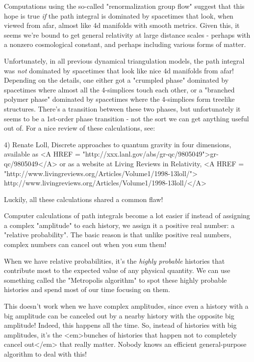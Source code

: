 Computations using the so-called "renormalization group flow" suggest 
that this hope is true \emph{if} the path integral is dominated by spacetimes 
that look, when viewed from afar, almost like 4d manifolds with smooth 
metrics.  Given this, it seems we're bound to get general relativity at
large distance scales - perhaps with a nonzero cosmological constant, and
perhaps including various forms of matter.  

Unfortunately, in all previous dynamical triangulation models, the path
integral was \emph{not} 
dominated by spacetimes that look like nice 4d manifolds
from afar!  Depending on the details, one either got a "crumpled 
phase"
dominated by spacetimes where almost all the 4-simplices touch each other,
or a "branched polymer phase" dominated by spacetimes where 
the 4-simplices
form treelike structures.  There's a transition between these two phases, 
but unfortunately it seems to be a 1st-order phase transition - not the 
sort we can get anything useful out of.  For a nice review of these 
calculations, see:

4) Renate Loll, Discrete approaches to quantum gravity in four dimensions,
available as 
<A HREF = "http://xxx.lanl.gov/abs/gr-qc/9805049">gr-qc/9805049</A> 
or as a website at Living Reviews in Relativity, 
<A HREF = "http://www.livingreviews.org/Articles/Volume1/1998-13loll/">
http://www.livingreviews.org/Articles/Volume1/1998-13loll/</A>

Luckily, all these calculations shared a common flaw!

Computer calculations of path integrals become a lot easier if instead of 
assigning a complex "amplitude" to each history, we assign it a 
positive
real number: a "relative probability".   The basic reason is 
that unlike 
positive real numbers, complex numbers can cancel out when you sum them! 
 
When we have relative probabilities, it's the \emph{highly probable} 
histories 
that contribute most to the expected value of any physical quantity.  We
can use something called the "Metropolis algorithm" to spot 
these highly
probable histories and spend most of our time focusing on them.  

This doesn't work when we have complex amplitudes, since even a history 
with a big amplitude can be canceled out by a nearby history with the 
opposite big amplitude!  Indeed, this happens all the time.  So, instead 
of histories with big amplitudes, it's the <em>bunches of histories that 
happen not to completely cancel out</em> that really matter.  Nobody knows an 
efficient general-purpose algorithm to deal with this!
 

